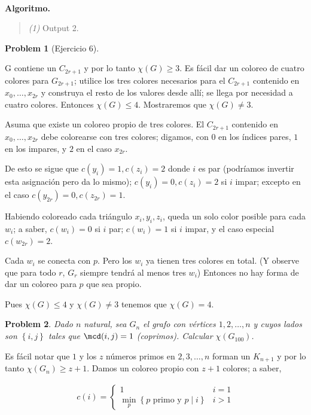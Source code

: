 \documentclass[a4paper, 12pt]{article}
\newtheorem{problem}{Problem}
\newtheorem{problem}{Problem}
\begin{document}
~

\textbf{Algoritmo.} 
\begin{quote}
    \textit{(1)} Output 2.
\end{quote}

\pagebreak

\begin{problem}[Ejercicio 6]
\end{problem} 

G contiene un $C_{2r + 1}$ y por lo tanto $\chi(G) \geq 3$. Es fácil dar un
coloreo de cuatro colores para $G_{2r+1}$; utilice los tres colores necesarios
para el $C_{2r+1}$ contenido en $x_0, \ldots, x_{2r}$ y construya el resto de
los valores desde allí; se llega por necesidad a cuatro colores. Entonces
$\chi(G) \leq 4$. Mostraremos que $\chi(G) \neq 3$.

Asuma que existe un coloreo propio de tres colores. El $C_{2r+1}$ contenido en
$x_0, \ldots, x_{2r}$ debe colorearse con tres colores; digamos, con $0$ en los
índices pares, $1$ en los impares, y $2$ en el caso $x_{2r}$.

De esto se sigue que $c(y_i) = 1, c(z_i) = 2$ donde $i$ es par (podríamos
invertir esta asignación pero da lo mismo); $c(y_i) = 0, c(z_i) = 2$ si $i$
impar; excepto en el caso $c(y_{2r}) = 0, c(z_{2r}) = 1$.

Habiendo coloreado cada triángulo $x_i, y_i, z_i$, queda un solo color posible
para cada $w_i$; a saber, $c(w_i) = 0$ si $i$ par; $c(w_i) = 1$ si $i$ impar, y
el caso especial $c(w_{2r}) = 2$.

Cada $w_i$ se conecta con $p$. Pero los $w_i$ ya tienen tres colores en total.
(Y observe que para todo $r$, $G_r$ siempre tendrá al menos tres $w_i$) Entonces
no hay forma de dar un coloreo para $p$ que sea propio.

Pues $\chi(G) \leq 4$ y $\chi(G) \neq 3$ tenemos que $\chi(G) = 4$.
\pagebreak
\begin{problem}
    Dado $n$ natural, sea $G_n$ el grafo con vértices $1, 2, \ldots, n$ y cuyos
    lados son $\left\{ i, j \right\} $ tales que $\mcd(i, j) = 1$ (coprimos).
    Calcular $\chi(G_{100})$.
\end{problem}

Es fácil notar que $1$ y los $z$ números primos en $2, 3, \ldots, n$ forman un
$K_{n+1}$ y por lo tanto $\chi(G_{n}) \geq z + 1$. Damos un coloreo propio con $z +
1$ colores; a saber,


\begin{align*}
    c(i) = \begin{cases}
        1 & i = 1 \\ 
        \min_{p} \left\{ p \text{ primo  y } p \mid i  \right\}  & i > 1
    \end{cases}
\end{align*}
\end{document}
